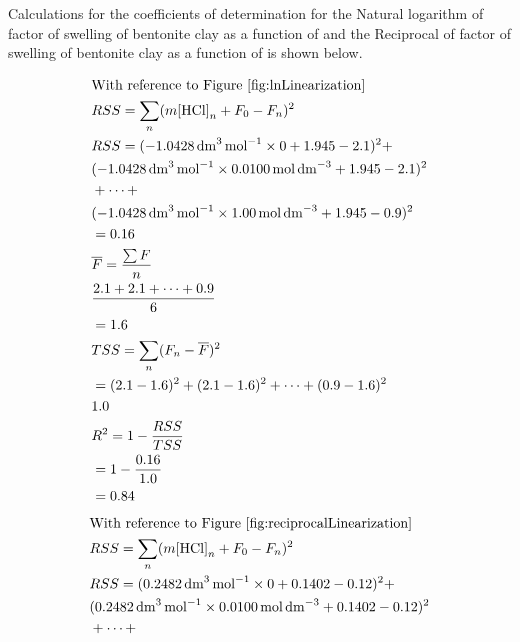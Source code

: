 \documentclass[11pt, letterpaper]{article}
\begin{document}
Calculations for the coefficients of determination for
the Natural logarithm of factor of swelling of bentonite clay
as a function of \ce{[HCl]} and the Reciprocal of factor of swelling
of bentonite clay as a function of \ce{[HCl]} is shown below.

\begingroup
\allowdisplaybreaks
\begin{paracol}{2}
    \begin{align*}
         & \text{With reference to Figure } \ref*{fig:lnLinearization}
        \\
         & RSS = \sum_{n} (m\ce{[HCl]}_n + F_0 - F_n)^2
        \\
         & RSS = (\SI{-1.0428}{dm^3.mol^{-1}}\times0 + 1.945 - 2.1)^2 +
        \\
         & (\SI{-1.0428}{dm^3.mol^{-1}}\times\SI{0.0100}{mol.dm^{-3}} + 1.945 - 2.1)^2
        \\
         & + \cdots +
        \\
         & (\SI{-1.0428}{dm^3.mol^{-1}}\times\SI{1.00}{mol.dm^{-3}} + 1.945 - 0.9)^2
        \\
         & = 0.16
        \\
         & \overline{F} = \frac{\sum F}{n}
        \\
         & \frac{2.1 + 2.1 + \cdots + 0.9}{6}
        \\
         & = 1.6
        \\
         & TSS = \sum_{n} (F_n - \overline{F})^2
        \\
         & = (2.1 - 1.6)^2 + (2.1 - 1.6)^2 + \cdots + (0.9 - 1.6)^2
        \\
         & 1.0
        \\
         & R^2 = 1 - \frac{RSS}{TSS}
        \\
         & = 1 - \frac{0.16}{1.0}
        \\
         & = 0.84
    \end{align*}
    \switchcolumn
    \begin{align*}
         & \text{With reference to Figure } \ref*{fig:reciprocalLinearization}
        \\
         & RSS = \sum_{n} (m\ce{[HCl]}_n + F_0 - F_n)^2
        \\
         & RSS = (\SI{0.2482}{dm^3.mol^{-1}}\times0 + 0.1402 - 0.12)^2 +
        \\
         & (\SI{0.2482}{dm^3.mol^{-1}}\times\SI{0.0100}{mol.dm^{-3}} + 0.1402 - 0.12)^2
        \\
         & + \cdots +
        \\

\end{align*}
\end{paracol}
\end{document}
